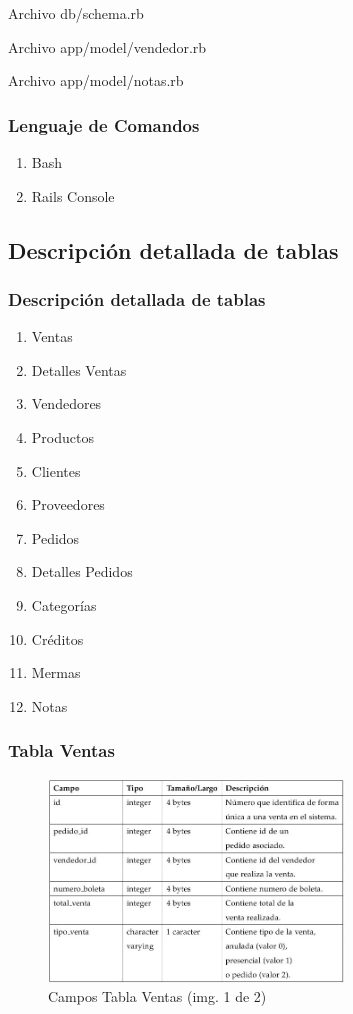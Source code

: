 \documentclass{beamer}
\begin{document}
\begin{frame}
Archivo db/schema.rb

\end{frame}

\begin{frame}
Archivo app/model/vendedor.rb

\end{frame}

\begin{frame}
Archivo app/model/notas.rb

\end{frame}

\begin{frame}
\frametitle{Lenguaje de Comandos}
\begin{enumerate}
\item Bash \pause
\item Rails Console
\end{enumerate}
\end{frame}

\subsection{Descripción detallada de tablas}

\begin{frame}
\frametitle{Descripción detallada de tablas}
\begin{enumerate}
\item \alert{Ventas}
\item \alert{Detalles Ventas}
\item \alert{Vendedores}
\item \alert{Productos} \pause
\item Clientes
\item Proveedores
\item Pedidos
\item Detalles Pedidos
\item Categorías
\item Créditos
\item Mermas
\item Notas
\end{enumerate}
\end{frame}

\begin{frame}
\frametitle{Tabla Ventas}
\begin{figure}
\includegraphics[width=0.7\textwidth]{images/tabla_ventas1.jpg}
\caption{Campos Tabla Ventas \tiny{(img. 1 de 2)}}
\end{figure}
\end{frame}
\end{document}
